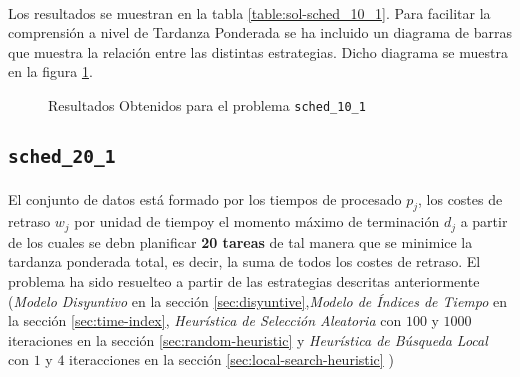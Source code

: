\documentclass[spanish]{article}
\begin{document}
			\paragraph{}
			Los resultados se muestran en la tabla \ref{table:sol-sched_10_1}. Para facilitar la comprensión a nivel de Tardanza Ponderada se ha incluido un diagrama de barras que muestra la relación entre las distintas estrategias. Dicho diagrama se muestra en la figura \ref{plot:sol-sched_10_1}.

			\begin{figure}[h]
				\begin{center}
				\end{center}
				\caption{Resultados Obtenidos para el problema \texttt{sched\_10\_1}}
				\label{plot:sol-sched_10_1}
			\end{figure}

		\subsection{\texttt{sched\_20\_1}}

			\paragraph{}
			El conjunto de datos está formado por los tiempos de procesado $p_j$, los costes de retraso $w_j$ por unidad de tiempoy el momento máximo de terminación $d_j$ a partir de los cuales se debn planificar \textbf{20 tareas} de tal manera que se minimice la tardanza ponderada total, es decir, la suma de todos los costes de retraso. El problema ha sido resuelteo a partir de las estrategias descritas anteriormente (\emph{Modelo Disyuntivo} en la sección \ref{sec:disyuntive},\emph{Modelo de Índices de Tiempo} en la sección \ref{sec:time-index}, \emph{Heurística de Selección Aleatoria} con $100$ y $1000$ iteraciones en la sección \ref{sec:random-heuristic} y \emph{Heurística de Búsqueda Local} con $1$ y $4$ iteracciones en la sección \ref{sec:local-search-heuristic} )
\end{document}
